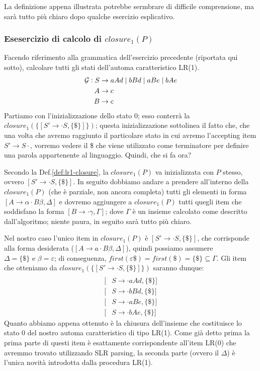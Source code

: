 \documentclass[class=book, crop=false, oneside, 12pt]{standalone}
\begin{document}
La definizione appena illustrata potrebbe sermbrare di difficile comprensione, ma sarà tutto più chiaro dopo qualche esercizio esplicativo.

\subsubsection{Esesercizio di calcolo di \(closure_1(P)\)}
Facendo riferimento alla grammatica dell'esercizio precedente (riportata qui sotto), calcolare tutti gli stati dell'automa caratteristico LR(1).
\begin{align}
    \label{eq:ex3-slr1-grammarr}
    \mathcal{G}: S &\to aAd \mid bBd \mid aBe \mid bAe \\
    A &\to c \nonumber \\ \notag
    B &\to c \notag
\end{align}
Partiamo con l'inizializzazione dello stato \(0\); esso conterrà la \(closure_1(\{[S' \to \cdot S, \{\$\}]\})\); questa inizializzazione sottolinea il fatto che, che una volta che avremo raggiunto il particolare stato in cui avremo l'accepting item \(S' \to S\cdot \), vorremo vedere il \$ che viene utilizzato come terminatore per definire una parola appartenente al linguaggio. Quindi, che si fa ora?

Secondo la Def.\ref{def:lr1-closure}, la \(closure_1(P)\) va inizializzata con \(P\) stesso, ovvero \([S' \to \cdot S, \{\$\}]\).
In seguito dobbiamo andare a prendere all'interno della \(closure_1(P)\) (che è parziale, non ancora completa) tutti gli elementi in forma \([A \rightarrow \alpha \cdot B \beta, \Delta]\) e dovremo aggiungere a \(closure_1(P)\) tutti quegli item che soddisfano la forma \([B \rightarrow \cdot \gamma, \Gamma]\); dove \(\Gamma\) è un insieme calcolato come descritto dall'algoritmo; niente paura, in seguito sarà tutto più chiaro.

Nel nostro caso l'unico item in \(closure_1(P)\) è \([S' \to \cdot S, \{\$\}]\), che corrisponde alla forma desiderata (\([A \to a \cdot B\beta, \Delta]\)), quindi possiamo assumere \(\Delta = \{\$\} \textrm{ e } \beta = \varepsilon\); di conseguenza, \(first(\varepsilon \$) = first(\$) = \{\$\} \subseteq \Gamma\). Gli item che otteniamo da \(closure_1(\{[S' \to \cdot S, \{\$\}]\})\) saranno dunque:
\begin{align*}
    [&S' \to \cdot S, \{\$\}] \\
    [&S \to \cdot aAd, \{\$\}] \\
	[&S \to \cdot bBd, \{\$\}] \\
	[&S \to \cdot aBe, \{\$\}] \\
	[&S \to \cdot bAe, \{\$\}]
\end{align*}
Quanto abbiamo appena ottenuto è la chiusura dell'insieme che costituisce lo stato 0 del nostro automa caratteristico di tipo LR(1).
Come già detto prima la prima parte di questi item è esattamente corrispondente all'item LR(0) che avremmo trovato utilizzando SLR parsing, la seconda parte (ovvero il \(\Delta\)) è l'unica novità introdotta dalla procedura LR(1).
\end{document}
